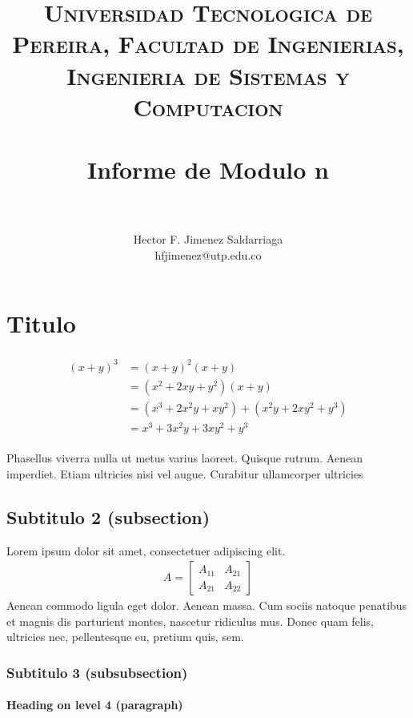 \documentclass[paper=a4, fontsize=11pt]{scrartcl} %
\title{	
\normalfont \normalsize 
\textsc{Universidad Tecnologica de Pereira, Facultad de Ingenierias, Ingenieria de Sistemas y Computacion } \\[24pt] 
\horrule{0.5pt} \\[0.4cm] 					     %
\huge Informe de Modulo n\\					 %
\horrule{2pt} \\[0.5cm] 						 %
}
\author{Hector F. Jimenez Saldarriaga \\ hfjimenez@utp.edu.co }
\date{\normalsize} 						 %
\numberwithin{equation}{section} %
\numberwithin{figure}{section} %
\numberwithin{table}{section} %
\begin{document}
\maketitle %

\section{Titulo}

\lipsum[2] %

\begin{align} 
\begin{split}
(x+y)^3 	&= (x+y)^2(x+y)\\
&=(x^2+2xy+y^2)(x+y)\\
&=(x^3+2x^2y+xy^2) + (x^2y+2xy^2+y^3)\\
&=x^3+3x^2y+3xy^2+y^3
\end{split}					
\end{align}

Phasellus viverra nulla ut metus varius laoreet. Quisque rutrum. Aenean imperdiet. Etiam ultricies nisi vel augue. Curabitur ullamcorper ultricies


\subsection{Subtitulo 2 (subsection)}

Lorem ipsum dolor sit amet, consectetuer adipiscing elit. 
\begin{align}
A = 
\begin{bmatrix}
A_{11} & A_{21} \\
A_{21} & A_{22}
\end{bmatrix}
\end{align}
Aenean commodo ligula eget dolor. Aenean massa. Cum sociis natoque penatibus et magnis dis parturient montes, nascetur ridiculus mus. Donec quam felis, ultricies nec, pellentesque eu, pretium quis, sem.

\subsubsection{Subtitulo 3 (subsubsection)}
\lipsum[3] %
\paragraph{Heading on level 4 (paragraph)}
\lipsum[6] %
\end{document}
